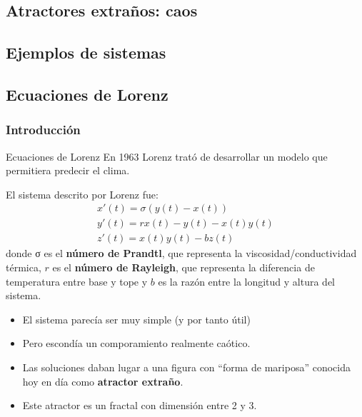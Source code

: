 \documentclass[8pt]{beamer}
\begin{document}
\subsection{Atractores extraños: caos}

\subsection{Ejemplos de sistemas}

\subsection{Ecuaciones de Lorenz}

\subsubsection{Introducción}
\begin{frame}
\begin{block}{Ecuaciones de Lorenz}
En 1963 Lorenz trató de desarrollar un modelo que permitiera predecir el clima.

El sistema descrito por Lorenz fue:
\[\begin{array}{l}
x'(t) = σ(y(t)-x(t)) \\
y'(t) = rx(t)-y(t)-x(t)y(t)\\
z'(t) = x(t)y(t)-bz(t)
\end{array}\]
donde σ es el \textbf{número de Prandtl}, que representa la viscosidad/conductividad térmica, $r$ es el \textbf{número de Rayleigh}, que representa la diferencia de temperatura entre base y tope y $b$ es la razón entre la longitud y altura del sistema.
\end{block}

\begin{itemize}
\item El sistema parecía ser muy simple (y por tanto útil)
\item Pero escondía un comporamiento realmente caótico.
\item Las soluciones daban lugar a una figura con ``forma de mariposa'' conocida hoy en día como \textbf{atractor extraño}.
\item Este atractor es un fractal con dimensión entre 2 y 3.
\end{itemize}
\end{frame}
\end{document}
